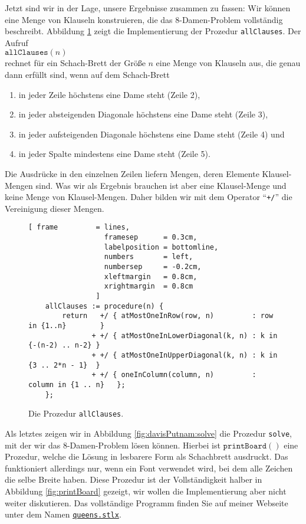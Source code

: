 Jetzt sind wir in der Lage, unsere Ergebnisse zusammen zu fassen:  Wir k\"{o}nnen eine
Menge von Klauseln konstruieren, die das 8-Damen-Problem vollst\"{a}ndig beschreibt.
Abbildung \ref{fig:allClauses} zeigt die Implementierung der Prozedur \texttt{allClauses}.
Der Aufruf \\[0.2cm]
\hspace*{1.3cm} $\mathtt{allClauses}(n)$ \\[0.2cm]
rechnet f\"{u}r ein Schach-Brett der Gr\"{o}\ss{}e $n$ eine Menge von Klauseln aus, die
genau dann erf\"{u}llt sind, wenn auf dem Schach-Brett
\begin{enumerate}
\item in jeder Zeile h\"{o}chstens eine Dame steht (Zeile 2),
\item in jeder absteigenden Diagonale h\"{o}chstens eine Dame steht (Zeile 3),
\item in jeder aufsteigenden Diagonale h\"{o}chstens eine Dame steht (Zeile 4) und
\item in jeder Spalte mindestens eine Dame steht (Zeile 5).
\end{enumerate}
Die Ausdr\"{u}cke in den einzelnen Zeilen liefern Mengen, deren Elemente
Klausel-Mengen sind.  Was wir als Ergebnis brauchen ist aber eine Klausel-Menge
und keine Menge von Klausel-Mengen.  Daher bilden wir mit dem Operator ``\texttt{+/}''
die Vereinigung dieser Mengen.

\begin{figure}[!ht]
  \centering
\begin{Verbatim}[ frame         = lines, 
                  framesep      = 0.3cm, 
                  labelposition = bottomline,
                  numbers       = left,
                  numbersep     = -0.2cm,
                  xleftmargin   = 0.8cm,
                  xrightmargin  = 0.8cm
                ]
    allClauses := procedure(n) {
        return   +/ { atMostOneInRow(row, n)         : row in {1..n}        }
               + +/ { atMostOneInLowerDiagonal(k, n) : k in {-(n-2) .. n-2} }
               + +/ { atMostOneInUpperDiagonal(k, n) : k in {3 .. 2*n - 1}  }
               + +/ { oneInColumn(column, n)         : column in {1 .. n}   };
    };
\end{Verbatim}
\vspace*{-0.3cm}
  \caption{Die Prozedur \texttt{allClauses}.}
  \label{fig:allClauses}
\end{figure}

Als letztes zeigen wir in Abbildung \ref{fig:davisPutnam:solve} die Prozedur
\texttt{solve}, mit der wir das 8-Damen-Problem l\"{o}sen k\"{o}nnen.
Hierbei ist $\texttt{printBoard}()$ eine Prozedur, welche die L\"{o}sung in lesbarere Form als Schachbrett
ausdruckt.  Das funktioniert allerdings nur, wenn ein Font verwendet wird, bei dem alle Zeichen die
selbe Breite haben.  Diese Prozedur ist der Vollst\"{a}ndigkeit halber in Abbildung \ref{fig:printBoard}
gezeigt, wir wollen die Implementierung aber nicht weiter diskutieren.
Das vollst\"{a}ndige Programm finden Sie auf meiner Webseite unter dem Namen
\href{https://github.com/karlstroetmann/Logik/blob/master/SetlX/queens.stlx}{\texttt{queens.stlx}}.


